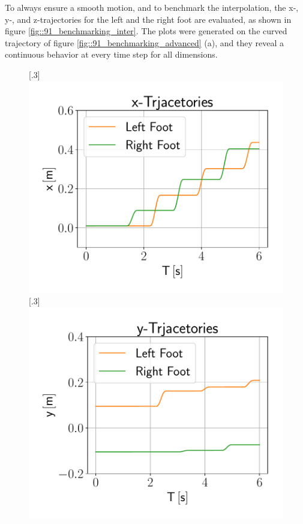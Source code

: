 To always ensure a smooth motion, and to benchmark the interpolation, the x-, y-, and z-trajectories for the left and the right foot are evaluated, as shown in figure \ref{fig::91_benchmarking_inter}. The plots were generated on the curved trajectory of figure \ref{fig::91_benchmarking_advanced} (a), and they reveal a continuous behavior at every time step for all dimensions.
\begin{figure}[h!]
	\centering
	[.3\linewidth]{\includegraphics[scale=.3]{chapters/09_user_controlled_walking_experiments/img/01_benchmarking/interpolated_x_trajectories.pdf}}
	[.3\linewidth]{\includegraphics[scale=.3]{chapters/09_user_controlled_walking_experiments/img/01_benchmarking/interpolated_y_trajectories.pdf}}

\end{figure}
